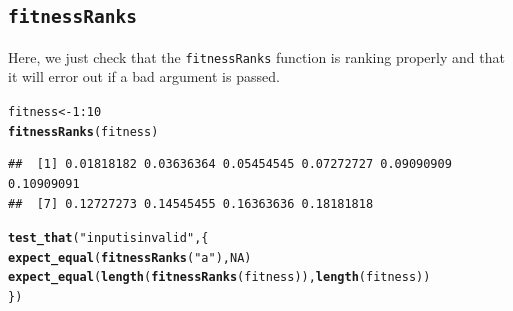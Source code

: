 \documentclass{article}\usepackage[]{graphicx}\usepackage[]{color}
\makeatletter
\newcommand{\hlnum}[1]{\textcolor[rgb]{0.686,0.059,0.569}{#1}}%
\newcommand{\hlstr}[1]{\textcolor[rgb]{0.192,0.494,0.8}{#1}}%
\newcommand{\hlopt}[1]{\textcolor[rgb]{0,0,0}{#1}}%
\newcommand{\hlstd}[1]{\textcolor[rgb]{0.345,0.345,0.345}{#1}}%
\newcommand{\hlkwb}[1]{\textcolor[rgb]{0.69,0.353,0.396}{#1}}%
\newcommand{\hlkwd}[1]{\textcolor[rgb]{0.737,0.353,0.396}{\textbf{#1}}}%
\newenvironment{kframe}{%
 \def\at@end@of@kframe{}%
 \ifinner\ifhmode%
  \def\at@end@of@kframe{\end{minipage}}%
  \begin{minipage}{\columnwidth}%
 \fi\fi%
 \def\FrameCommand##1{\hskip\@totalleftmargin \hskip-\fboxsep
 \colorbox{shadecolor}{##1}\hskip-\fboxsep
     \hskip-\linewidth \hskip-\@totalleftmargin \hskip\columnwidth}%
 \MakeFramed {\advance\hsize-\width
   \@totalleftmargin\z@ \linewidth\hsize
   \@setminipage}}%
 {\par\unskip\endMakeFramed%
 \at@end@of@kframe}
\newenvironment{knitrout}{}{} %
\makeatother
\begin{document}
\subsection{\texttt{fitnessRanks}}
Here, we just check that the \texttt{fitnessRanks} function is ranking properly and that it will error out if a bad argument is passed.
\begin{knitrout}
\color{fgcolor}\begin{kframe}
\begin{alltt}
\hlstd{fitness} \hlkwb{<-} \hlnum{1}\hlopt{:}\hlnum{10}
\hlkwd{fitnessRanks}\hlstd{(fitness)}
\end{alltt}
\begin{verbatim}
##  [1] 0.01818182 0.03636364 0.05454545 0.07272727 0.09090909 0.10909091
##  [7] 0.12727273 0.14545455 0.16363636 0.18181818
\end{verbatim}
\begin{alltt}
\hlkwd{test_that}\hlstd{(}\hlstr{"input is invalid"}\hlstd{,\{}
  \hlkwd{expect_equal}\hlstd{(}\hlkwd{fitnessRanks}\hlstd{(}\hlstr{"a"}\hlstd{),} \hlnum{NA}\hlstd{)}
  \hlkwd{expect_equal}\hlstd{(}\hlkwd{length}\hlstd{(}\hlkwd{fitnessRanks}\hlstd{(fitness)),}\hlkwd{length}\hlstd{(fitness))}
\hlstd{\})}
\end{alltt}
\end{kframe}
\end{knitrout}
\end{document}
